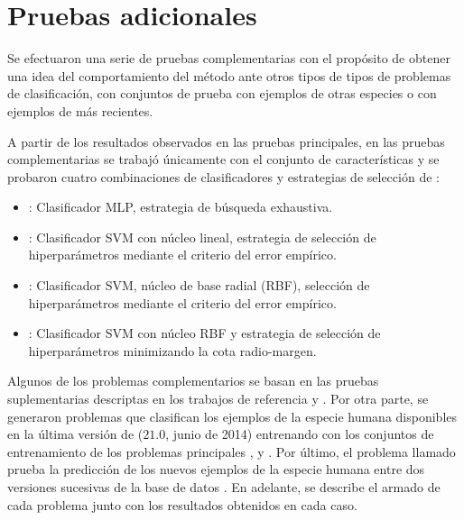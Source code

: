 %
%
%
\section{Pruebas adicionales}
%
Se efectuaron una serie de pruebas complementarias con el propósito de
obtener una idea del comportamiento del método ante otros tipos de
tipos de problemas de clasificación, con conjuntos de prueba con
ejemplos de otras especies o con ejemplos de  más
recientes.

A partir de los resultados observados en las pruebas principales,
en las pruebas complementarias se trabajó únicamente con el conjunto
de características  y se probaron cuatro combinaciones de
clasificadores y estrategias de selección de :
%
\begin{itemize}
\item
  : Clasificador MLP, estrategia de búsqueda exhaustiva.
\item
  : Clasificador SVM con núcleo lineal, estrategia de
  selección de hiperparámetros mediante el criterio del error
  empírico.
\item
  : Clasificador SVM, núcleo de base radial (RBF),
  selección de hiperparámetros mediante el criterio del error
  empírico.
\item
  : Clasificador SVM con núcleo RBF y estrategia de
  selección de hiperparámetros minimizando la cota radio-margen.
\end{itemize}
%

Algunos de los problemas complementarios se basan en las pruebas
suplementarias descriptas en los trabajos de referencia \cite{xue} y
\cite{ng}.
Por otra parte, se generaron problemas que clasifican los ejemplos de
la especie humana disponibles en la última versión de \dset\mirbase{}
($21$.$0$, junio de 2014) entrenando con los conjuntos de entrenamiento
de los problemas principales \prob\tripletsvm{}, \prob\mipred{} y
\prob\micropred{}.
Por último, el problema llamado \prob\deltamirbase{} prueba la
predicción de los nuevos ejemplos de la especie humana entre dos
versiones sucesivas de la base de datos \dset\mirbase{}.
En adelante, se describe el armado de cada problema junto con los
resultados obtenidos en cada caso.

